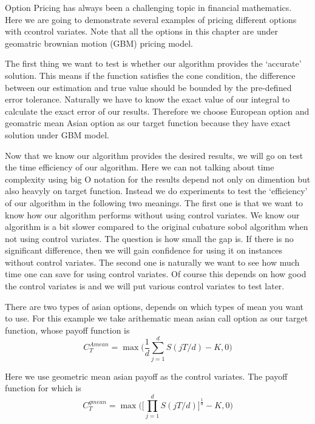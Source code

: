 Option Pricing has always been a challenging topic in financial mathematics.
Here we are going to demonstrate several examples of pricing different options with ccontrol variates.
Note that all the options in this chapter are under geomatric brownian motion (GBM) pricing model. 


The first thing we want to test is whether our algorithm provides the `accurate' solution. This means if the function satisfies the cone condition, the difference between our estimation and true value should be bounded by the pre-defined error tolerance. Naturally we have to know the exact value of our integral to calculate the exact error of our results. Therefore we choose European option and geomatric mean Asian option as our target function because they have exact solution under GBM model.





Now that we know our algorithm provides the desired results, we will go on test the time efficiency of our algorithm. 
Here we can not talking about time complexity using big O notation for the results depend not only on dimention but also heavyly on target function. 
Instead we do experiments to test the `efficiency' of our algorithm in the following two meanings. 
The first one is that we want to know how our algorithm performs without using control variates. 
We know our algorithm is a bit slower compared to the original cubature sobol algorithm \cite{hickernell2014reliable} when not using control variates. 
The question is how small the gap is. 
If there is no significant difference, then we will gain confidence for using it on instances without control variates. 
The second one is naturally we want to see how much time one can save for using control variates. Of course this depends on how good the control variates is and we will put various control variates to test later.         

There are two types of asian options, depends on which types of mean you want to use. For this example we take arithematic mean asian call option as our target function, whose payoff function is
\[ C_{T}^{Amean} = \max\Big(\frac{1}{d}\sum_{j=1}^{d}S(jT/d)-K, 0\Big)\]

Here we use geometric mean asian payoff as the control variates. The payoff function for which is 
\[ C_{T}^{gmean} = \max\Big(\Big[\prod_{j=1}^{d}S(jT/d) \Big]^\frac{1}{d}-K, 0\Big)\]

